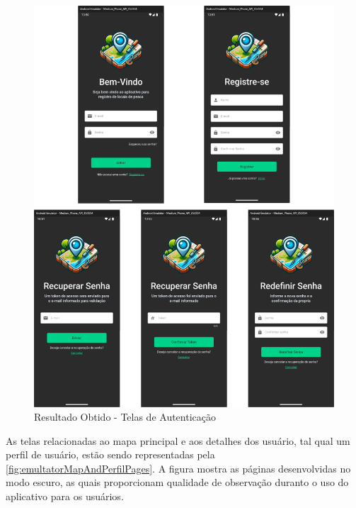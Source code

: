 \begin{figure}[H]
    \centering
    \caption{Resultado Obtido - Telas de Autenticação}
    \label{fig:emultatorAuthPages}
    \includegraphics[scale=0.35]{./dados/figuras/emulator-auth-pages.png}
\end{figure}


As telas relacionadas ao mapa principal e aos detalhes dos usuário, tal qual um perfil de usuário, estão sendo representadas pela \autoref{fig:emultatorMapAndPerfilPages}. A figura mostra as páginas desenvolvidas no modo escuro, as quais proporcionam qualidade de observação duranto o uso do aplicativo para os usuários.


